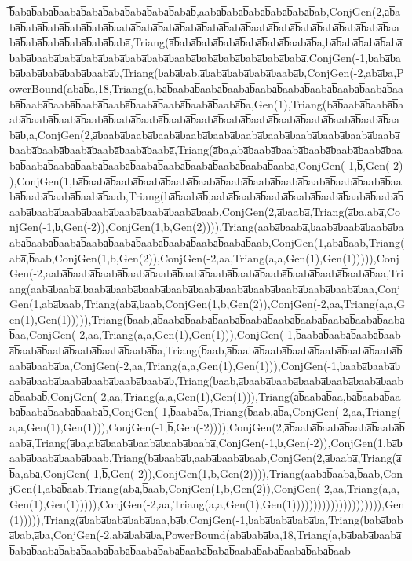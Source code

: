 ̅b̅aba̅b̅aba̅b̅aaba̅b̅aba̅b̅aba̅b̅aba̅b̅aba̅b̅aba̅b̅,aaba̅b̅aba̅b̅aba̅b̅aba̅b̅aba̅b̅ab,ConjGen(2,a̅b̅aba̅b̅aba̅b̅aba̅b̅aba̅b̅aba̅b̅aaba̅b̅aba̅b̅aba̅b̅aba̅b̅aba̅b̅aba̅b̅aaba̅b̅aba̅b̅aba̅b̅aba̅b̅aba̅b̅aba̅b̅aaba̅b̅aba̅b̅aba̅b̅aba̅b̅aba̅b̅aba̅,Triang(a̅b̅aba̅b̅aba̅b̅aba̅b̅aba̅b̅aba̅b̅aaba̅b̅a,ba̅b̅aba̅b̅aba̅b̅aba̅b̅aba̅b̅aaba̅b̅aba̅b̅aba̅b̅aba̅b̅aba̅b̅aba̅b̅aaba̅b̅aba̅b̅aba̅b̅aba̅b̅aba̅b̅aba̅,ConjGen(-1,b̅aba̅b̅aba̅b̅aba̅b̅aba̅b̅aba̅b̅aaba̅b̅,Triang(b̅aba̅b̅ab,a̅b̅aba̅b̅aba̅b̅aba̅b̅aaba̅b̅,ConjGen(-2,aba̅b̅a,PowerBound(aba̅b̅a,18,Triang(a,ba̅b̅aaba̅b̅aaba̅b̅aaba̅b̅aaba̅b̅aaba̅b̅aaba̅b̅aaba̅b̅aaba̅b̅aaba̅b̅aaba̅b̅aaba̅b̅aaba̅b̅aaba̅b̅aaba̅b̅aaba̅b̅aaba̅b̅aaba̅b̅a,Gen(1),Triang(ba̅b̅aaba̅b̅aaba̅b̅aaba̅b̅aaba̅b̅aaba̅b̅aaba̅b̅aaba̅b̅aaba̅b̅aaba̅b̅aaba̅b̅aaba̅b̅aaba̅b̅aaba̅b̅aaba̅b̅aaba̅b̅aaba̅b̅aaba̅b̅,a,ConjGen(2,a̅b̅aaba̅b̅aaba̅b̅aaba̅b̅aaba̅b̅aaba̅b̅aaba̅b̅aaba̅b̅aaba̅b̅aaba̅b̅aaba̅b̅aaba̅b̅aaba̅b̅aaba̅b̅aaba̅b̅aaba̅b̅aaba̅b̅aaba̅,Triang(a̅b̅a,aba̅b̅aaba̅b̅aaba̅b̅aaba̅b̅aaba̅b̅aaba̅b̅aaba̅b̅aaba̅b̅aaba̅b̅aaba̅b̅aaba̅b̅aaba̅b̅aaba̅b̅aaba̅b̅aaba̅b̅aaba̅b̅aaba̅,ConjGen(-1,b̅,Gen(-2)),ConjGen(1,ba̅b̅aaba̅b̅aaba̅b̅aaba̅b̅aaba̅b̅aaba̅b̅aaba̅b̅aaba̅b̅aaba̅b̅aaba̅b̅aaba̅b̅aaba̅b̅aaba̅b̅aaba̅b̅aaba̅b̅aaba̅b̅aab,Triang(ba̅b̅aaba̅b̅,aaba̅b̅aaba̅b̅aaba̅b̅aaba̅b̅aaba̅b̅aaba̅b̅aaba̅b̅aaba̅b̅aaba̅b̅aaba̅b̅aaba̅b̅aaba̅b̅aaba̅b̅aaba̅b̅aab,ConjGen(2,a̅b̅aaba̅,Triang(a̅b̅a,aba̅,ConjGen(-1,b̅,Gen(-2)),ConjGen(1,b,Gen(2)))),Triang(aaba̅b̅aaba̅,b̅aaba̅b̅aaba̅b̅aaba̅b̅aaba̅b̅aaba̅b̅aaba̅b̅aaba̅b̅aaba̅b̅aaba̅b̅aaba̅b̅aaba̅b̅aaba̅b̅aab,ConjGen(1,aba̅b̅aab,Triang(aba̅,b̅aab,ConjGen(1,b,Gen(2)),ConjGen(-2,aa,Triang(a,a,Gen(1),Gen(1))))),ConjGen(-2,aaba̅b̅aaba̅b̅aaba̅b̅aaba̅b̅aaba̅b̅aaba̅b̅aaba̅b̅aaba̅b̅aaba̅b̅aaba̅b̅aaba̅b̅aaba̅b̅aa,Triang(aaba̅b̅aaba̅,b̅aaba̅b̅aaba̅b̅aaba̅b̅aaba̅b̅aaba̅b̅aaba̅b̅aaba̅b̅aaba̅b̅aaba̅b̅aaba̅b̅aa,ConjGen(1,aba̅b̅aab,Triang(aba̅,b̅aab,ConjGen(1,b,Gen(2)),ConjGen(-2,aa,Triang(a,a,Gen(1),Gen(1))))),Triang(b̅aab,a̅b̅aaba̅b̅aaba̅b̅aaba̅b̅aaba̅b̅aaba̅b̅aaba̅b̅aaba̅b̅aaba̅b̅aaba̅b̅aa,ConjGen(-2,aa,Triang(a,a,Gen(1),Gen(1))),ConjGen(-1,b̅aaba̅b̅aaba̅b̅aaba̅b̅aaba̅b̅aaba̅b̅aaba̅b̅aaba̅b̅aaba̅b̅aaba̅b̅a,Triang(b̅aab,a̅b̅aaba̅b̅aaba̅b̅aaba̅b̅aaba̅b̅aaba̅b̅aaba̅b̅aaba̅b̅aaba̅b̅a,ConjGen(-2,aa,Triang(a,a,Gen(1),Gen(1))),ConjGen(-1,b̅aaba̅b̅aaba̅b̅aaba̅b̅aaba̅b̅aaba̅b̅aaba̅b̅aaba̅b̅aaba̅b̅,Triang(b̅aab,a̅b̅aaba̅b̅aaba̅b̅aaba̅b̅aaba̅b̅aaba̅b̅aaba̅b̅aaba̅b̅,ConjGen(-2,aa,Triang(a,a,Gen(1),Gen(1))),Triang(a̅b̅aaba̅b̅aa,ba̅b̅aaba̅b̅aaba̅b̅aaba̅b̅aaba̅b̅aaba̅b̅,ConjGen(-1,b̅aaba̅b̅a,Triang(b̅aab,a̅b̅a,ConjGen(-2,aa,Triang(a,a,Gen(1),Gen(1))),ConjGen(-1,b̅,Gen(-2)))),ConjGen(2,a̅b̅aaba̅b̅aaba̅b̅aaba̅b̅aaba̅b̅aaba̅,Triang(a̅b̅a,aba̅b̅aaba̅b̅aaba̅b̅aaba̅b̅aaba̅,ConjGen(-1,b̅,Gen(-2)),ConjGen(1,ba̅b̅aaba̅b̅aaba̅b̅aaba̅b̅aab,Triang(ba̅b̅aaba̅b̅,aaba̅b̅aaba̅b̅aab,ConjGen(2,a̅b̅aaba̅,Triang(a̅b̅a,aba̅,ConjGen(-1,b̅,Gen(-2)),ConjGen(1,b,Gen(2)))),Triang(aaba̅b̅aaba̅,b̅aab,ConjGen(1,aba̅b̅aab,Triang(aba̅,b̅aab,ConjGen(1,b,Gen(2)),ConjGen(-2,aa,Triang(a,a,Gen(1),Gen(1))))),ConjGen(-2,aa,Triang(a,a,Gen(1),Gen(1))))))))))))))))))))),Gen(1))))),Triang(a̅b̅aba̅b̅aba̅b̅aba̅b̅aa,ba̅b̅,ConjGen(-1,b̅aba̅b̅aba̅b̅aba̅b̅a,Triang(b̅aba̅b̅aba̅b̅ab,a̅b̅a,ConjGen(-2,aba̅b̅aba̅b̅a,PowerBound(aba̅b̅aba̅b̅a,18,Triang(a,ba̅b̅aba̅b̅aaba̅b̅aba̅b̅aaba̅b̅aba̅b̅aaba̅b̅aba̅b̅aaba̅b̅aba̅b̅aaba̅b̅aba̅b̅aaba̅b̅aba̅b̅aaba̅b̅aba̅b̅aab
